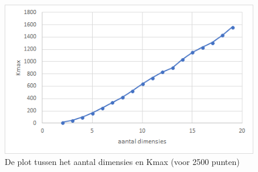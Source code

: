\documentclass[12pt]{article}
\begin{document}
\begin{figure}
\includegraphics[width=\textwidth]{dim-Kmax.png}
\caption{De plot tussen het aantal dimensies en Kmax (voor 2500 punten)}
\end{figure}
\end{document}

